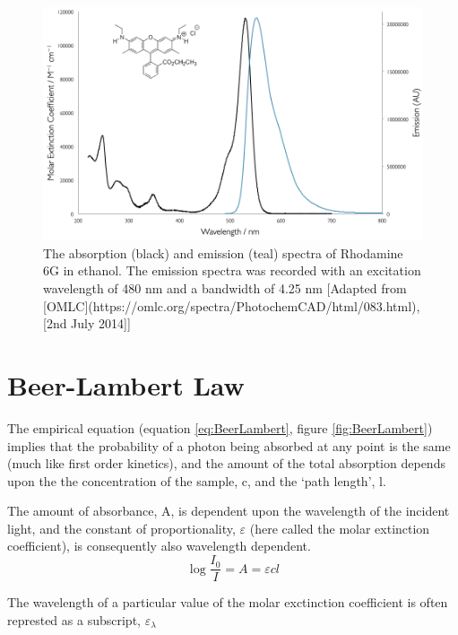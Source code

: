 \documentclass[
]{book}
\begin{document}
\begin{figure}

{\centering \includegraphics[width=0.6\linewidth]{images/Rhodamine6GAbsEm} 

}

\caption{The absorption (black) and emission (teal) spectra of Rhodamine 6G in ethanol. The emission spectra was recorded with an excitation wavelength of 480 nm and a bandwidth of 4.25 nm [Adapted from [OMLC](https://omlc.org/spectra/PhotochemCAD/html/083.html), [2nd July 2014]]}\label{fig:RhoAbsEm}
\end{figure}

\hypertarget{sec:BeerLambert}{%
\section{Beer-Lambert Law}\label{sec:BeerLambert}}

The empirical equation (equation \eqref{eq:BeerLambert}, figure \ref{fig:BeerLambert}) implies that the probability of a photon being absorbed at any point is the same (much like first order kinetics), and the amount of the total absorption depends upon the the concentration of the sample, c, and the `path length', l.

The amount of absorbance, A, is dependent upon the wavelength of the incident light, and the constant of proportionality, \(\varepsilon\) (here called the molar extinction coefficient), is consequently also wavelength dependent.
\begin{equation}
\log \frac{I_0}{I}=A=\varepsilon cl
\label{eq:BeerLambert}
\end{equation}

The wavelength of a particular value of the molar exctinction coefficient is often represted as a subscript, \(\varepsilon _\lambda\)
\end{document}
